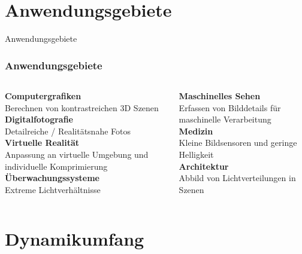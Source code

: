 \documentclass{beamer}
\begin{document}
	\section{Anwendungsgebiete}
	
	\begin{frame}
		\begin{center}
			\Huge Anwendungsgebiete
		\end{center}
	\end{frame}

	\begin{frame}
		\frametitle{Anwendungsgebiete}
		\begin{columns}
			\begin{column}{0.5\textwidth}
			\textbf{Computergrafiken}\\
			\small Berechnen von kontrastreichen 3D Szenen\\
			\vspace{5mm}
			\textbf{Digitalfotografie}\\
			\small Detailreiche / Realitätsnahe Fotos \\
			\vspace{5mm}
			\textbf{Virtuelle Realität}\\
			\small Anpassung an virtuelle Umgebung und individuelle Komprimierung \\
			\vspace{5mm}
			\textbf{Überwachungssysteme}\\
			\small Extreme Lichtverhältnisse
			\end{column}
			\begin{column}{0.5\textwidth}
			\textbf{Maschinelles Sehen}\\
			\small Erfassen von Bilddetails für maschinelle Verarbeitung \\
			\vspace{5mm} 
			\textbf{Medizin}\\
			\small Kleine Bildsensoren und geringe Helligkeit \\
			\vspace{5mm} 
			\textbf{Architektur}\\
			\small Abbild von Lichtverteilungen in Szenen
			\end{column}
		\end{columns}
	\end{frame}

	\section{Dynamikumfang}
	
\end{document}
